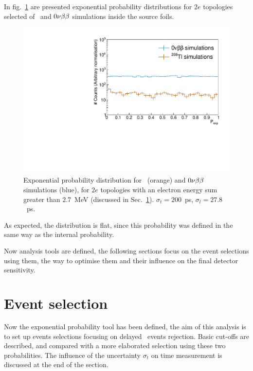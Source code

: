 In fig.~\ref{fig:Pexp_Tl} are presented exponential probability distributions for $2e$ topologies selected of \Tl\ and $0\nu\beta\beta$ simulations inside the source foils.
\begin{figure}[!h]
  \centering
  \includegraphics[width=13cm]{timedifference/fig_timediff/proba_expo_400.pdf}
  \caption{Exponential probability distribution for \Tl\ (orange) and $0\nu\beta\beta$ simulations (blue), for $2e$ topologies with an electron energy sum greater than $2.7$~MeV (discussed in Sec.~\ref{sec:ev_selection}).
    $\sigma_{t}=200$~ps, $\sigma_{l}=27.8$~ps.
    \label{fig:Pexp_Tl}}
\end{figure}
As expected, the distribution is flat, since this probability was defined in the same way as the internal probability.

Now analysis tools are defined, the following sections focus on the event selections using them, the way to optimise them and their influence on the final detector sensitivity.

\section{Event selection}
\label{sec:ev_selection}


Now the exponential probability tool has been defined, the aim of this analysis is to set up events selections focusing on delayed \Tl\ events rejection.
Basic cut-offs are described, and compared with a more elaborated selection using these two probabilities.
The influence of the uncertainty $\sigma_{t}$ on time measurement is discussed at the end of the section.

